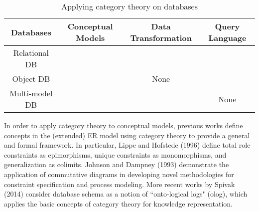 \begin{table*}
\caption{Applying category theory on databases}
\label{tab:relatedwork}
\begin{tabular}{ cccc } 
  \toprule
Databases & Conceptual Models & Data Transformation & Query Language  \\ [0.5ex] 
  \midrule
 \multirow{2}{*}{Relational DB} & \cite{journals/ita/LippeH96,143868,piessens1995categorical,conf/amast/JohnsonD93} & \cite{islam1994categorical,DBLP:journals/corr/abs-1009-1166} & \cite{journals/pacmpl/GibbonsHHW18,journals/mscs/BaclawskiSW94} \\
  & \cite{johnson2002entity,journals/cj/HofstedeLF96} & \cite{DBLP:journals/corr/abs-1903-10579,conf/dbpl/SpivakW15} & \cite{johnson2001view,10.5555/2628001,DBLP:conf/icdt/Libkin95,conf/icdt/TannenBW92} \\
  
 Object DB & \cite{journals/tcs/TuijnG96,conf/icdt/TuijnG92}  & None & \cite{conf/pods/OhoriT94,conf/icdt/TannenBW92}  \\ 
 
 Multi-model DB & \cite{conf/vldb/LiuLGHPW18,thiry2018categories,journals/jbd/KoupilH22}  & \cite{conf/er/HolubovaSL19} &   None  \\ 
 \bottomrule 
\end{tabular}
\end{table*}


In order to apply category theory to conceptual models, previous works define concepts in the (extended) ER model using category theory to provide a general and formal framework. In particular, Lippe and Hofstede (1996) \cite{journals/ita/LippeH96} define total role constraints as epimorphisms, unique constraints as monomorphisms, and generalization as colimits. Johnson and Dampney (1993) \cite{conf/amast/JohnsonD93} demonstrate the application of commutative diagrams in developing novel methodologies for constraint specification and process modeling. More recent works by Spivak  (2014) \cite{10.5555/2628001}  consider database schema as a notion of ``onto-logical logs" (olog), which applies the basic concepts of category theory for knowledge representation. 






